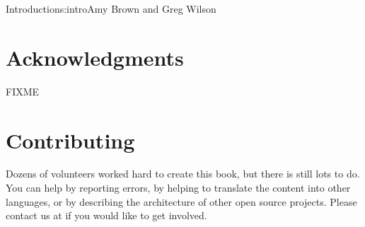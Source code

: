 \begin{aosachapter}{Introduction}{s:intro}{Amy Brown and Greg Wilson}
\section*{Acknowledgments}

FIXME

\section*{Contributing}

Dozens of volunteers worked hard to create this book, but there is
still lots to do.  You can help by reporting errors, by helping to
translate the content into other languages, or by describing the
architecture of other open source projects.  Please contact us at
 if you would like to get involved.

\end{aosachapter}
